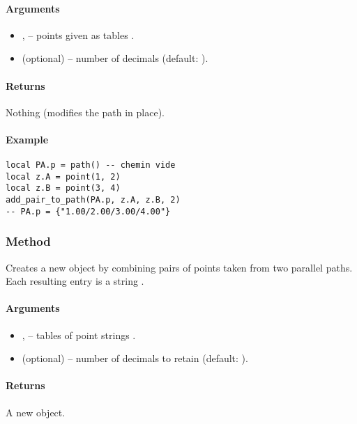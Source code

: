{\paragraph{Arguments}
\begin{itemize}
  \item {},  – points given as tables .
  \item {} (optional) – number of decimals (default: ).
\end{itemize}

\paragraph{Returns} Nothing (modifies the path in place).

\paragraph{Example}
\begin{verbatim}
local PA.p = path() -- chemin vide
local z.A = point(1, 2)
local z.B = point(3, 4)
add_pair_to_path(PA.p, z.A, z.B, 2)
-- PA.p = {"1.00/2.00/3.00/4.00"}
\end{verbatim}


\subsubsection{Method } %
\label{ssub:method_tkzmeth_path_path_from_pairs}

Creates a new  object by combining pairs of points taken from two parallel paths. Each resulting entry is a string .

\paragraph{Arguments}
\begin{itemize}
  \item {},  – tables of point strings .
  \item {} (optional) – number of decimals to retain (default: ).
\end{itemize}

\paragraph{Returns} A new  object.

}
